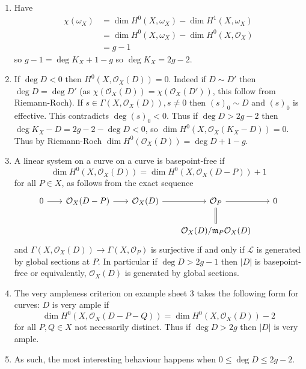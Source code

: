 \documentclass[a4paper]{article}
\newcommand{\sh}[1]{\mathcal{#1}} %
\begin{document}
\begin{remark}\leavevmode
  \begin{enumerate}
  \item Have
    \begin{align*}
      \chi(\omega_X)
      &= \dim H^0(X, \omega_X) - \dim H^1(X, \omega_X) \\
      &= \dim H^0(X, \omega_X) - \dim H^0(X, \sh O_X) \\
      &= g - 1
    \end{align*}
    so \(g - 1 = \deg K_X + 1 - g\) so \(\deg K_X = 2g - 2\).
  \item If \(\deg D < 0\) then \(H^0(X, \sh O_X(D)) = 0\). Indeed if \(D \sim D'\) then \(\deg D = \deg D'\) (as \(\chi(\sh O_X(D)) = \chi(\sh O_X(D'))\), this follow from Riemann-Roch). If \(s \in \Gamma(X, \sh O_X(D)), s \ne 0\) then \((s)_0 \sim D\) and \((s)_0\) is effective. This contradicts \(\deg (s)_0 < 0\). Thus if \(\deg D > 2g - 2\) then \(\deg K_X - D = 2g - 2 - \deg D < 0\), so \(\dim H^0(X, \sh O_X(K_X - D)) = 0\). Thus by Riemann-Roch \(\dim H^0(\sh O_X(D)) = \deg D + 1 - g\).
  \item A linear system on a curve on a curve is basepoint-free if
    \[
      \dim H^0(X, \sh O_X(D)) = \dim H^0(X, \sh O_X(D - P)) + 1
    \]
    for all \(P \in X\), as follows from the exact sequence
    \[
      \begin{tikzcd}[column sep=scriptsize]
        0 \ar[r] & \sh O_X(D - P) \ar[r] & \sh O_X(D) \ar[r] & \sh O_P \ar[r] \ar[d, equal] & 0 \\
        & & & \sh O_X(D)/\mathfrak m_P \sh O_X(D)
      \end{tikzcd}
    \]
    and \(\Gamma(X, \sh O_X(D)) \to \Gamma(X, \sh O_P)\) is surjective if and only if \(\sh L\) is generated by global sections at \(P\). In particular if \(\deg D > 2g - 1\) then \(|D|\) is basepoint-free or equivalently, \(\sh O_X(D)\) is generated by global sections.
  \item The very ampleness criterion on example sheet 3 takes the following form for curves: \(D\) is very ample if
    \[
      \dim H^0(X, \sh O_X(D - P - Q)) = \dim H^0(X, \sh O_X(D)) - 2
    \]
    for all \(P, Q \in X\) not necessarily distinct. Thus if \(\deg D > 2g\) then \(|D|\) is very ample.
  \item As such, the most interesting behaviour happens when \(0 \leq \deg D \leq 2g - 2\).
  \end{enumerate}
\end{remark}
\end{document}
